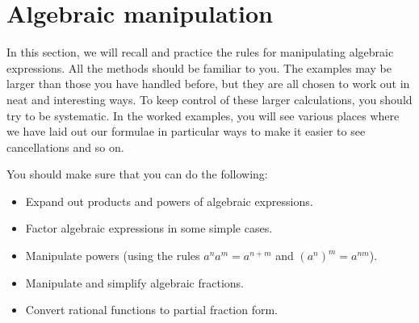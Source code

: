 \documentclass[a4paper]{book}
\theoremstyle{definition}
\begin{document}

\chapter{Algebraic manipulation}\label{chap-alg}

In this section, we will recall and practice the rules for
manipulating algebraic expressions.  All the methods should be
familiar to you.  The examples may be larger than those you have
handled before, but they are all chosen to work out in neat and
interesting ways.  To keep control of these larger calculations, you
should try to be systematic.  In the worked examples, you will see
various places where we have laid out our formulae in particular ways
to make it easier to see cancellations and so on.
\bigskip


You should make sure that you can do the following:
\begin{itemize}
 \item Expand out products and powers of algebraic expressions.
 \item Factor algebraic expressions in some simple cases.
 \item Manipulate powers (using the rules $a^na^m=a^{n+m}$ and
  $(a^n)^m=a^{nm}$).
 \item Manipulate and simplify algebraic fractions.
 \item Convert rational functions to partial fraction form.
\end{itemize}

\end{document}
